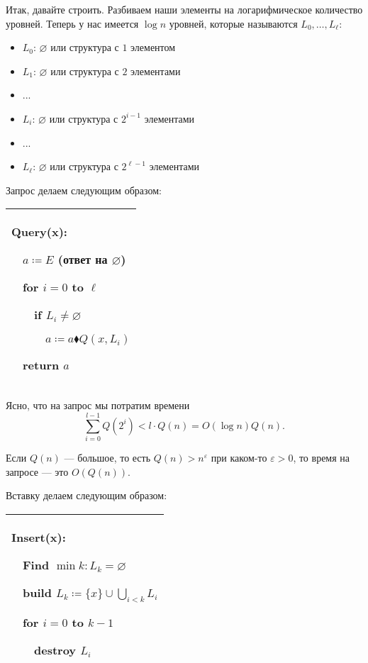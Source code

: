 Итак, давайте строить. Разбиваем наши элементы на логарифмическое количество уровней. Теперь у нас имеется $\log n $ уровней, которые называются $L_0,\ldots,L_\ell$: \begin{itemize}
    \item $L_0$: $\varnothing$ или структура с $1$ элементом

    \item $L_1$: $\varnothing$ или структура с $2$ элементами

    \item ...

    \item $L_i$: $\varnothing$ или структура с $2^{i-1}$ элементами

    \item ...

    \item $L_\ell$: $\varnothing$ или структура с $2^{\ell-1}$ элементами

\end{itemize}

Запрос делаем следующим образом:

\begin{tabular}{|p{4cm}|}
\hline
Query(x):

$\quad$$a \coloneqq E$ (ответ на $\varnothing$)

$\quad$for $i=0$ to $\ell$

$\quad$$\quad$if $L_i \ne \varnothing$

$\quad$$\quad$$\quad$$a \coloneqq a\blacklozenge Q(x,L_i)$

$\quad$return $a$\\
\hline
\end{tabular}


Ясно, что на запрос мы потратим времени $$\sum_{i=0}^{l-1}Q(2^i)<l\cdot Q(n)=O(\log n)Q(n).$$

\begin{remark}
Если $Q(n)$ — большое, то есть $Q(n)>n^\varepsilon$ при каком-то $\varepsilon >0$, то время на запросе — это $O(Q(n))$.
\end{remark} 

Вставку делаем следующим образом:

\begin{tabular}{|p{5cm}|}
\hline
Insert(x):

$\quad$Find $\min k: L_k=\varnothing$

$\quad$build $L_k \coloneqq \{x\}\cup \bigcup_{i<k} L_i$

$\quad$for $i=0$ to $k-1$ 

$\quad$$\quad$destroy $L_i$\\

\hline
\end{tabular}

